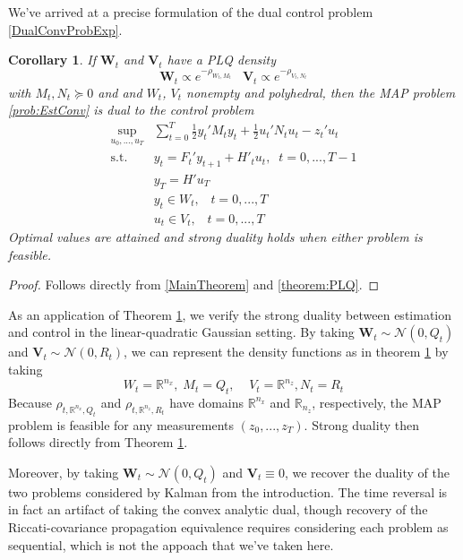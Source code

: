 \documentclass[12pt]{article}
\renewcommand{\vec}[1]{\mathbf{#1}}
\newtheorem{corollary}[theorem]{Corollary}
\theoremstyle{remark}
\theoremstyle{remark}
\begin{document}
We've arrived at a precise formulation of the dual control
problem \ref{DualConvProbExp}.
\begin{corollary}\label{theorem:DualMonitor}
If $\vec{W}_{t}$ and $\vec{V}_{t}$ have a PLQ density
$$\vec{W}_{t} \propto e^{-\rho_{W_{t}, M_{t}}} \;\;\; \vec{V}_{t} \propto
e^{-\rho_{V_{t}, N_{t}}}$$
with $M_{t}, N_{t} \succeq 0$ and and $W_{t}$, $V_{t}$ nonempty and
polyhedral,
then the MAP problem \ref{prob:EstConv} is dual to the control problem
\begin{align}\label{DualMonitor}
\sup_{u_{0},...,u_{T}} & \sum_{t=0}^{T} \frac{1}{2} y_{t}' M_{t} y_{t} +
\frac{1}{2} u_{t}' N_{t} u_{t} - z_{t}' u_{t} \\
\text{s.t. } & y_{t} = F_{t}' y_{t+1} + H'_{t} u_{t}, \; \;
t=0,...,T-1 \nonumber \\
& y_{T} = H' u_{T} \nonumber \\
& y_{t} \in W_{t}, \;\;\; t=0,...,T \\
& u_{t} \in V_{t}, \;\;\; t=0,...,T 
\end{align}
Optimal values are attained and strong duality holds when either
problem is feasible.
\end{corollary}
\begin{proof}
Follows directly from \ref{MainTheorem} and \ref{theorem:PLQ}.
\end{proof}
As an application of Theorem \ref{theorem:DualMonitor}, we verify the strong
duality between estimation and control in the linear-quadratic
Gaussian setting. By taking $\vec{W}_{t} \sim \mathcal{N}(0,Q_{t})$ and $\vec{V}_{t} \sim
\mathcal{N}(0,R_{t})$, we can represent the density functions as in
theorem \ref{theorem:DualMonitor} by taking
$$W_{t}=\mathbb{R}^{n_{x}}, \; M_{t} = Q_{t}, \;\;\;\; V_{t} =
\mathbb{R}^{n_{z}}, N_{t} = R_{t}$$ 
Because $\rho_{t, \mathbb{R}^{n_{x}}, Q_{t}}$ and $\rho_{t,
\mathbb{R}^{n_{z}}, R_{t}}$ have domains $\mathbb{R}^{n_{x}}$ and
$\mathbb{R}_{n_{z}}$, respectively, the MAP problem is feasible for
any measurements $(z_{0},...,z_{T})$. Strong duality then follows
directly from Theorem \ref{theorem:DualMonitor}.

Moreover, by taking $\vec{W}_{t} \sim \mathcal{N}(0, Q_{t})$ and
$\vec{V}_{t} \equiv 0$, we recover the duality of the two problems
considered by Kalman from the introduction. The time reversal is in fact an
artifact of taking the convex analytic dual, though recovery of the
Riccati-covariance propagation equivalence requires considering each problem as sequential,
which is not the appoach that we've taken here.
\end{document}
